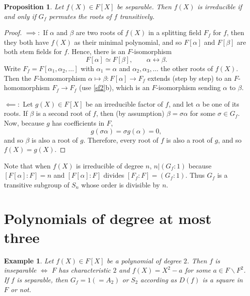 \documentclass[a4paper,11pt,final,openany]{memoir}
\newtheorem{proposition}[X]{Proposition}
\newtheorem{example}[X]{Example}
\theoremstyle{nonumberplain}
\newtheorem{proof}{Proof.}
\begin{document}
\begin{proposition}
\label{cg4} Let $f(X)\in F[X]$ be separable. Then $f(X)$ is irreducible if and
only if $G_{f}$ permutes the roots of $f$ transitively.
\end{proposition}

\begin{proof}
$\implies\colon$ If $\alpha$ and $\beta$ are two roots of $f(X)$ in a
splitting field $F_{f}$ for $f$, then they both have $f(X)$ as their minimal
polynomial, and so $F[\alpha]$ and $F[\beta]$ are both stem fields for $f$.
Hence, there is an $F$-isomorphism
\[
F[\alpha]\simeq F[\beta],\qquad\alpha\leftrightarrow\beta.
\]
Write $F_{f}=F[\alpha_{1},\alpha_{2},...]$ with $\alpha_{1}=\alpha$ and
$\alpha_{2},\alpha_{3},\ldots$ the other roots of $f(X)$. Then the
$F$-homomorphism $\alpha\mapsto\beta\colon F[\alpha]\rightarrow F_{f}$ extends
(step by step) to an $F$-homomorphism $F_{f}\rightarrow F_{f}$ (use
\ref{sf2}b), which is an $F$-isomorphism sending $\alpha$ to $\beta$.

$\impliedby\colon$ Let $g(X)\in F[X]$ be an irreducible factor of $f$, and let
$\alpha$ be one of its roots. If $\beta$ is a second root of $f$, then (by
assumption) $\beta=\sigma\alpha$ for some $\sigma\in G_{f}$. Now, because $g$
has coefficients in $F$,
\[
g(\sigma\alpha)=\sigma g(\alpha)=0,
\]
and so $\beta$ is also a root of $g$. Therefore, every root of $f$ is also a
root of $g$, and so $f(X)=g(X).$
\end{proof}

Note that when $f(X)$ is irreducible of degree $n$, $n|(G_{f}\colon1)$ because
$[F[\alpha]\colon F]=n$ and $[F[\alpha]\colon F]$ divides $[F_{f}\colon
F]=(G_{f}\colon1)$. Thus $G_{f}$ is a transitive subgroup of $S_{n}$ whose
order is divisible by $n$.

\section{Polynomials of degree at most three}

\begin{example}
\label{cg5}Let $f(X)\in F[X]$ be a polynomial of degree $2$. Then $f$ is
inseparable $\iff$ $F$ has characteristic $2$ and $f(X)=X^{2}-a$ for some
$a\in F\smallsetminus F^{2}$. If $f$ is separable, then $G_{f}=1(=A_{2})$ or
$S_{2}$ according as $D(f)$ is a square in $F$ or not.
\end{example}
\end{document}
